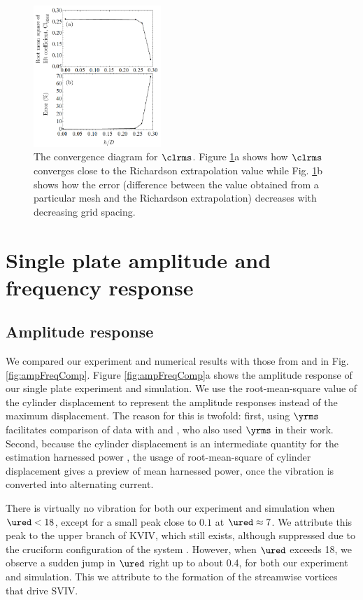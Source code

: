 \documentclass[a4paper,fleqn]{cas-sc}
\begin{document}
\begin{figure}
  \centering
  \includegraphics[width=0.43\textwidth]{figs/figure9}
  \caption{The convergence diagram for $\clrms$. Figure \ref{fig:clrmsGCI}a shows how $\clrms$ converges close to the Richardson extrapolation value while Fig. \ref{fig:clrmsGCI}b shows how the error (difference between the value obtained from a particular mesh and the Richardson extrapolation) decreases with decreasing grid spacing.} \label{fig:clrmsGCI}
\end{figure}

\section{Single plate amplitude and frequency response} \label{sec:singPlateResp}
\subsection{Amplitude response} \label{ssec:ampResp}
We compared our experiment and numerical results with those from \citet{Koide2013} and \citet{Nguyen2012} in Fig. \ref{fig:ampFreqComp}. Figure \ref{fig:ampFreqComp}a shows the amplitude response of our single plate experiment and simulation. We use the root-mean-square value of the cylinder displacement to represent the amplitude responses instead of the maximum displacement. The reason for this is twofold: first, using  $\yrms$  facilitates comparison of data with \citet{Nguyen2012} and \citet{Koide2013}, who also used  $\yrms$  in their work. Second, because the cylinder displacement is an intermediate quantity for the estimation harnessed power \citep{Maruai2017,Maruai2018}, the usage of root-mean-square of cylinder displacement gives a preview of mean harnessed power, once the vibration is converted into alternating current.

There is virtually no vibration for both our experiment and simulation when  $\ured < 18$, except for a small peak close to $0.1$ at  $\ured \approx 7$. We attribute this peak to the upper branch of KVIV, which still exists, although suppressed due to the cruciform configuration of the system \citep{Shirakashi1989,Nguyen2012}. However, when  $\ured$ exceeds 18, we observe a sudden jump in  $\ured$ right up to about 0.4, for both our experiment and simulation. This we attribute to the formation of the streamwise vortices that drive SVIV.
\end{document}
